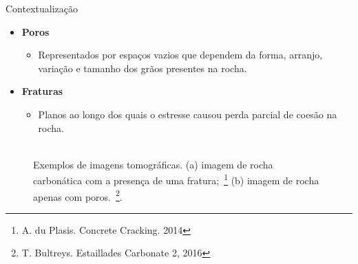 \documentclass{beamer}
\begin{document}
\begin{frame}{Contextualização}
    \begin{itemize}
        \item \textbf{Poros}
        \begin{itemize}
            \item Representados por espaços vazios que dependem da forma, arranjo, variação e tamanho dos grãos presentes na rocha.
        \end{itemize}
        \item \textbf{Fraturas}
        \begin{itemize}
            \item Planos ao longo dos quais o estresse causou perda parcial de coesão na rocha.
        \end{itemize}
    \end{itemize}
    
    
    \begin{figure}[!htb]
        \centering
         \hspace*{0.1cm}
        \\
         \scriptsize{Exemplos de imagens tomográficas. (a) imagem de rocha carbonática com a presença de uma fratura;~\protect\footnote{A.  du  Plasis.    Concrete  Cracking. 2014} (b) imagem de rocha apenas com poros.~\protect\footnote{T. Bultreys.  Estaillades Carbonate 2, 2016}.}
        \label{fig:microct}
    \end{figure}

\end{frame}
\end{document}
